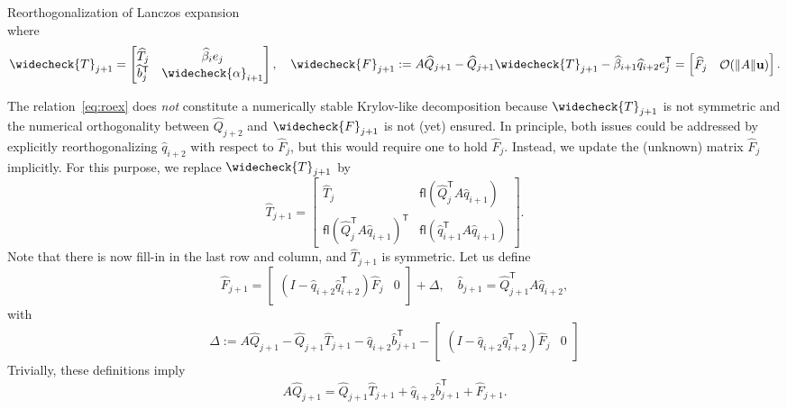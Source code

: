 \documentclass{siamart190516}
\newcommand{\Ttran}{\mathsf{T}}
\newcommand{\defi}{:=}
\newcommand{\order}{\mathcal{O}}
\newcommand{\fl}{\mathsf{fl}}
\newcommand{\mpr}{\mathbf{u}}
\providecommand{\norm}[1]{\lVert#1\rVert}
\begin{document}
\begin{paragraph}{Reorthogonalization of Lanczos expansion}
\begin{equation}
\end{equation}
where
\begin{equation*}
    \widecheck{T}_{j+1} = \begin{bmatrix}
        \widehat{T}_{j} & \widehat{\beta}_{i}e_{j}\\ 
        \widehat{b}_{j}^{\Ttran} & \widecheck{\alpha}_{i+1}
    \end{bmatrix},\quad 
    \widecheck{F}_{j+1} \defi 
    A\widehat{Q}_{j+1} - \widehat{Q}_{j+1}\widecheck{T}_{j+1}-\widehat{\beta}_{i+1}\widehat{q}_{i+2}e_{j}^{\Ttran}
    = \begin{bmatrix}
        \widehat{F}_{j}& \order(\norm{A}\mpr)
    \end{bmatrix}.
\end{equation*}

The relation~\eqref{eq:roex} does \emph{not} constitute a numerically stable Krylov-like decomposition because $\widecheck{T}_{j+1}$ is not symmetric and 
the numerical orthogonality between $\widehat{Q}_{j+2}$ and $\widecheck{F}_{j+1}$ is not (yet) ensured.
In principle, both issues could be addressed by explicitly reorthogonalizing $\widehat{q}_{i+2}$ with respect to $\widehat{F}_{j}$, but this would require one to hold $\widehat{F}_{j}$. Instead, we update the (unknown) matrix $\widehat{F}_{j}$ implicitly. For this purpose, we replace $\widecheck{T}_{j+1}$ by 
\begin{equation*}
    \widehat{T}_{j+1} = \begin{bmatrix}
        \widehat{T}_{j} & \fl(\widehat{Q}_{j}^{\Ttran}A\widehat{q}_{i+1}) \\ 
        \fl(\widehat{Q}_{j}^{\Ttran}A\widehat{q}_{i+1})^{\Ttran} & \fl(\widehat{q}_{i+1}^{\Ttran}A\widehat{q}_{i+1})
    \end{bmatrix}.
\end{equation*}
Note that there is now fill-in in the last row and column, and $\widehat{T}_{j+1}$ is symmetric.
Let us define  
\begin{equation}  \label{eq:deffjp1}
    \widehat{F}_{j+1} = \begin{bmatrix}
        (I-\widehat{q}_{i+2}\widehat{q}_{i+2}^{\Ttran})\widehat{F}_{j} & 0
    \end{bmatrix}+\Delta,\quad 
    \widehat{b}_{j+1} =\widehat{Q}_{j+1}^{\Ttran}A\widehat{q}_{i+2},
\end{equation}
with
\begin{equation*}
    \Delta :=  A\widehat{Q}_{j+1} - \widehat{Q}_{j+1}\widehat{T}_{j+1}-\widehat{q}_{i+2}\widehat{b}_{j+1}^{\Ttran}- \begin{bmatrix}
        (I-\widehat{q}_{i+2}\widehat{q}_{i+2}^{\Ttran})\widehat{F}_{j} & 0
    \end{bmatrix}
\end{equation*}
Trivially, these definitions imply 
\begin{equation}
    \label{eq:roen}
    A\widehat{Q}_{j+1} = \widehat{Q}_{j+1}\widehat{T}_{j+1}+\widehat{q}_{i+2}\widehat{b}_{j+1}^{\Ttran}+\widehat{F}_{j+1}.
\end{equation}


\end{paragraph}
\end{document}
